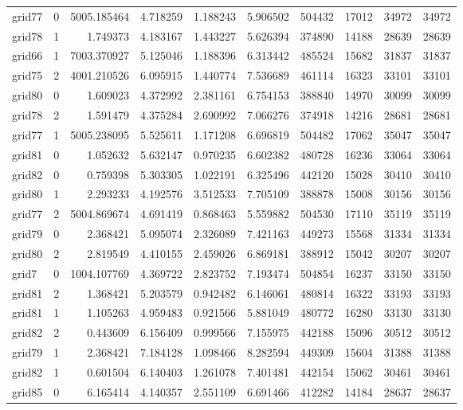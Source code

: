 \begin{longtable}{|l|r|r|r|r|r|r|r|r|r|}
grid77 & 0 & 5005.185464 & 4.718259 & 1.188243 & 5.906502 & 504432 & 17012 & 34972 & 34972 \\
grid78 & 1 & 1.749373 & 4.183167 & 1.443227 & 5.626394 & 374890 & 14188 & 28639 & 28639 \\
grid66 & 1 & 7003.370927 & 5.125046 & 1.188396 & 6.313442 & 485524 & 15682 & 31837 & 31837 \\
grid75 & 2 & 4001.210526 & 6.095915 & 1.440774 & 7.536689 & 461114 & 16323 & 33101 & 33101 \\
grid80 & 0 & 1.609023 & 4.372992 & 2.381161 & 6.754153 & 388840 & 14970 & 30099 & 30099 \\
grid78 & 2 & 1.591479 & 4.375284 & 2.690992 & 7.066276 & 374918 & 14216 & 28681 & 28681 \\
grid77 & 1 & 5005.238095 & 5.525611 & 1.171208 & 6.696819 & 504482 & 17062 & 35047 & 35047 \\
grid81 & 0 & 1.052632 & 5.632147 & 0.970235 & 6.602382 & 480728 & 16236 & 33064 & 33064 \\
grid82 & 0 & 0.759398 & 5.303305 & 1.022191 & 6.325496 & 442120 & 15028 & 30410 & 30410 \\
grid80 & 1 & 2.293233 & 4.192576 & 3.512533 & 7.705109 & 388878 & 15008 & 30156 & 30156 \\
grid77 & 2 & 5004.869674 & 4.691419 & 0.868463 & 5.559882 & 504530 & 17110 & 35119 & 35119 \\
grid79 & 0 & 2.368421 & 5.095074 & 2.326089 & 7.421163 & 449273 & 15568 & 31334 & 31334 \\
grid80 & 2 & 2.819549 & 4.410155 & 2.459026 & 6.869181 & 388912 & 15042 & 30207 & 30207 \\
grid7 & 0 & 1004.107769 & 4.369722 & 2.823752 & 7.193474 & 504854 & 16237 & 33150 & 33150 \\
grid81 & 2 & 1.368421 & 5.203579 & 0.942482 & 6.146061 & 480814 & 16322 & 33193 & 33193 \\
grid81 & 1 & 1.105263 & 4.959483 & 0.921566 & 5.881049 & 480772 & 16280 & 33130 & 33130 \\
grid82 & 2 & 0.443609 & 6.156409 & 0.999566 & 7.155975 & 442188 & 15096 & 30512 & 30512 \\
grid79 & 1 & 2.368421 & 7.184128 & 1.098466 & 8.282594 & 449309 & 15604 & 31388 & 31388 \\
grid82 & 1 & 0.601504 & 6.140403 & 1.261078 & 7.401481 & 442154 & 15062 & 30461 & 30461 \\
grid85 & 0 & 6.165414 & 4.140357 & 2.551109 & 6.691466 & 412282 & 14184 & 28637 & 28637 \\

\end{longtable}

